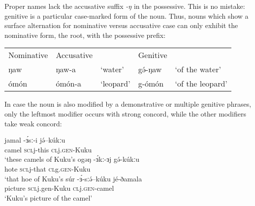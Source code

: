 Proper names lack the accusative suffix \textit{-ŋ} in the  possessive. This is no mistake: genitive is a particular case-marked form of the noun. Thus, nouns which show a surface alternation for nominative versus accusative case can only exhibit the nominative form, the root, with the possessive prefix:

\ea 
\begin{tabular}[t]{lllll}
Nominative & Accusative & & Genitive & \\
ŋaw & ŋaw-a & `water' & gə́-ŋaw & ‘of the water’ \\
ómón & ómón-a & `leopard' &  g-ómón & `of the leopard'
\end{tabular} 
\z

In case the noun is also modified by a demonstrative or multiple genitive phrases, only the leftmost modifier occurs with strong concord, while the other modifiers take weak concord: 

\ea 
	\ea \gll jamal -ɜ́sː-i jə́--kúkːu	\\	
		camel \textsc{scl}j-this \textsc{cl}j.\textsc{gen}-Kuku\\	
		\glt ‘these camels of Kuku’s
	\ex	\gll  ogəŋ -ɜ́kː-ɜj   gə́-kúkːu		\\
			   hote \textsc{scl}j-that \textsc{cl}g.\textsc{gen}-Kuku\\
		\glt 	`that hoe of Kuku’s
	\ex \gll súr -ɜ́-sːə́--kúku jé-ðamala	\\
			picture \textsc{scl}j.gen-Kuku \textsc{cl}j.\textsc{gen}-camel\\
			‘Kuku’s picture of the camel’ 
	\z
\z 




